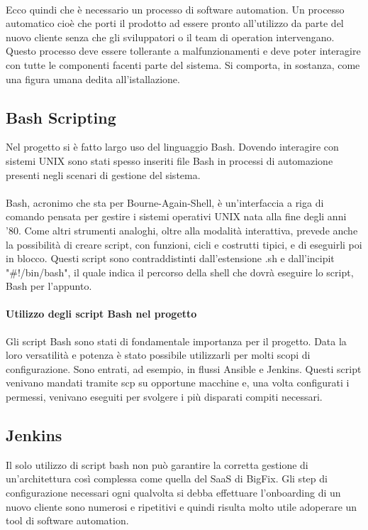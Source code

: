 \paragraph{}
Ecco quindi che è necessario un processo di software automation. Un processo automatico cioè che porti il prodotto ad essere pronto all'utilizzo da parte del nuovo cliente senza che gli sviluppatori o il team di operation intervengano. Questo processo deve essere tollerante a malfunzionamenti e deve poter interagire con tutte le componenti facenti parte del sistema. Si comporta, in sostanza, come una figura umana dedita all'istallazione. 

\subsection{Bash Scripting}
Nel progetto si è fatto largo uso del linguaggio Bash. Dovendo interagire con sistemi UNIX sono stati spesso inseriti file Bash in processi di automazione presenti negli scenari di gestione del sistema.
\paragraph{}
Bash, acronimo che sta per Bourne-Again-Shell, è un'interfaccia a riga di comando pensata per gestire i sistemi operativi UNIX nata alla fine degli anni '80. Come altri strumenti analoghi, oltre alla modalità interattiva, prevede anche la possibilità di creare script, con funzioni, cicli e costrutti tipici, e di eseguirli poi in blocco. Questi script sono contraddistinti dall'estensione .sh e dall'incipit "\#!/bin/bash", il quale indica il percorso della shell che dovrà eseguire lo script, Bash per l'appunto. 
\paragraph{Utilizzo degli script Bash nel progetto}
Gli script Bash sono stati di fondamentale importanza per il progetto. Data la loro versatilità e potenza è stato possibile utilizzarli per molti scopi di configurazione. Sono entrati, ad esempio, in flussi Ansible e Jenkins. Questi script venivano mandati tramite scp su opportune macchine e, una volta configurati i permessi, venivano eseguiti per svolgere i più disparati compiti necessari.
\subsection{Jenkins}
Il solo utilizzo di script bash non può garantire la corretta gestione di un'architettura così complessa come quella del SaaS di BigFix. Gli step di configurazione necessari ogni qualvolta si debba effettuare l'onboarding di un nuovo cliente sono numerosi e ripetitivi e quindi risulta molto utile adoperare un tool di software automation.

